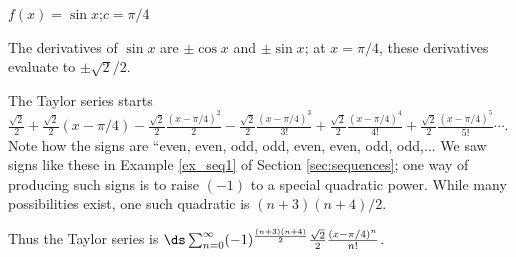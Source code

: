 {$f(x) = \sin x$;\quad $c=\pi/4$
}
{The derivatives of $\sin x$ are $\pm \cos x$ and $\pm \sin x$; at $x=\pi/4$, these derivatives evaluate to $\pm \sqrt{2}/2$. 

The Taylor series starts $\frac{\sqrt{2}}2+\frac{\sqrt{2}}2(x-\pi/4) - \frac{\sqrt{2}}2\frac{(x-\pi/4)^2}{2}-\frac{\sqrt{2}}2\frac{(x-\pi/4)^3}{3!}+\frac{\sqrt{2}}2\frac{(x-\pi/4)^4}{4!}+\frac{\sqrt{2}}2\frac{(x-\pi/4)^5}{5!}\cdots$. Note how the signs are ``even, even, odd, odd, even, even, odd, odd,$\ldots$ We saw signs like these in Example \ref{ex_seq1} of Section \ref{sec:sequences}; one way of producing such signs is to raise $(-1)$ to a special quadratic power. While many possibilities exist, 
one such quadratic is $(n+3)(n+4)/2$. 

Thus the Taylor series is $\ds \sum_{n=0}^\infty (-1)^{\frac{(n+3)(n+4)}{2}}\frac{\sqrt2}{2}\frac{(x-\pi/4)^n}{n!}$.
}